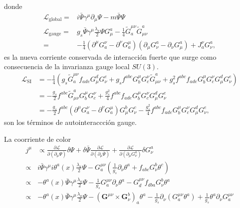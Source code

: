 donde
\begin{align}
\mathcal{L}_{\text{global}}=&i\bar{\Psi}\gamma^\mu\partial_\mu\Psi-m\bar{\Psi}\Psi\nonumber\\
  \mathcal{L}_{\text{gauge}}=&g_s\bar{\Psi}\gamma^\mu\frac{\lambda_a}{2}\Psi G_\mu^a
  - \frac{1}{4}\widetilde{G}^{\mu\nu}_a \widetilde{G}_{\mu\nu}^a\nonumber\\
=&-\frac{1}{4}\left(\partial^\mu G^\nu_a-\partial^\nu G^\mu_a\right)\left(\partial_\mu G_\nu^a-\partial_\nu G_\mu^a\right)+J^\nu_aG_\nu^a,
\end{align}
es la nueva corriente conservada de interacci\'on fuerte que surge como consecuencia de la invarianza gauge local $SU(3)$. 
\begin{align}
  \mathcal{L}_{\text{SI}}&=- \frac{1}{4}\left(g_s\widetilde{G}^{\mu\nu}_af_{a d e}G^d_\mu G^e_\nu
    +g_sf^{a b c}G_b^\mu G_c^\nu\widetilde{G}_{\mu\nu}^a
    +g_s^2f^{a b c}f_{a d e}G_b^\mu G_c^\nu G^d_\mu G^e_\nu\right)\nonumber\\
  &=- \frac{g_s}{2}f^{a b c}\widetilde{G}_{\mu\nu}^aG_b^\mu G_c^\nu
    +\frac{g_s^2}{4}f^{a b c}f_{a d e}G_b^\mu G_c^\nu G^d_\mu G^e_\nu\nonumber\\
  &=-\frac{g_s}{2}f^{abc}\left(\partial^\mu G^\nu_a-\partial^\nu G^\mu_a\right)G^b_\mu G^c_\nu-\frac{g_s^2}{4}f^{abc}f_{ade}G^\mu_bG^\nu_cG^d_\mu G^e_\nu,
\end{align}
son los t\'erminos de autointeraccci\'on gauge.

La coorriente de color
\begin{align}
j^\mu&\propto\frac{\partial\mathcal{L}}{\partial\left(\partial_\mu\Psi\right)}\delta\Psi+\delta\bar{\Psi}\frac{\partial\mathcal{L}}{\partial\left(\partial_\mu\bar{\Psi}\right)}
+\frac{\partial\mathcal{L}}{\partial\left(\partial_\mu G_\nu^a\right)}\delta G_\nu^a\nonumber\\
    \propto&i\bar{\Psi}\gamma^\mu i\theta^a(x)\frac{\lambda_a}{2}\Psi-G^{\mu\nu}_a\left(\frac{1}{g_s}\partial_\nu\theta^a+f_{abc}G_\nu^b\theta^c\right)\nonumber\\
   \propto&-\theta^a(x)\bar{\Psi}\gamma^\mu\frac{\lambda_a}{2}\Psi-\frac{1}{g_s}G^{\mu\nu}_a\partial_\nu\theta^a-G^{\mu\nu}_df_{dba}G_\nu^b\theta^a\nonumber\\
   \propto&-\theta^a(x)\bar{\Psi}\gamma^\mu\frac{\lambda_a}{2}\Psi-\left(\mathbf{G}^{\mu\nu}\times\mathbf{G}_\nu^b\right)_a\theta^a-\frac{1}{g_s}\partial_\nu(G^{\mu\nu}_a\theta^a)+
   \frac{1}{g_s}\theta^a\partial_\nu G^{\mu\nu}_a
\end{align}

